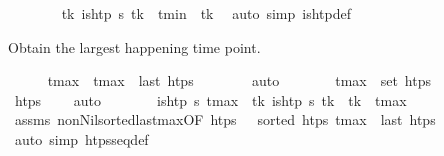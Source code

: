 \begin{isabellebody}
\ \ \ \ \ \ \isamarkupfalse%
\ {\isacartoucheopen}{\isasymforall}t\isactrlsub k{\isachardot}{\kern0pt}\ is{\isacharunderscore}{\kern0pt}htp\ {\isasympi}s\ t\isactrlsub k\ {\isasymlongrightarrow}\ t\isactrlsub m\isactrlsub i\isactrlsub n\ {\isasymle}\ t\isactrlsub k{\isacartoucheclose}\ \isamarkupfalse%
\ {\isacharparenleft}{\kern0pt}auto\ simp{\isacharcolon}{\kern0pt}\ is{\isacharunderscore}{\kern0pt}htp{\isacharunderscore}{\kern0pt}def{\isacharparenright}{\kern0pt}%
\begin{isamarkuptext}%
Obtain the largest happening time point.%
\end{isamarkuptext}\isamarkuptrue%
\ \ \ \ \isamarkupfalse%
\ t\isactrlsub m\isactrlsub a\isactrlsub x\ \ {\isachardoublequoteopen}t\isactrlsub m\isactrlsub a\isactrlsub x\ {\isacharequal}{\kern0pt}\ last\ htps{\isachardoublequoteclose}\isanewline
\ \ \ \ \ \ \isamarkupfalse%
\ auto\isanewline
\ \ \ \ \isamarkupfalse%
\ \isamarkupfalse%
\ {\isachardoublequoteopen}t\isactrlsub m\isactrlsub a\isactrlsub x\ {\isasymin}\ set\ htps{\isachardoublequoteclose}\isanewline
\ \ \ \ \ \ \isamarkupfalse%
\ {\isacartoucheopen}htps\ {\isasymnoteq}\ {\isacharbrackleft}{\kern0pt}{\isacharbrackright}{\kern0pt}{\isacartoucheclose}\ \isamarkupfalse%
\ auto\isanewline
\ \ \ \ \isamarkupfalse%
\ \isamarkupfalse%
\ {\isachardoublequoteopen}is{\isacharunderscore}{\kern0pt}htp\ {\isasympi}s\ t\isactrlsub m\isactrlsub a\isactrlsub x{\isachardoublequoteclose}\ \ {\isachardoublequoteopen}{\isasymforall}t\isactrlsub k{\isachardot}{\kern0pt}\ is{\isacharunderscore}{\kern0pt}htp\ {\isasympi}s\ t\isactrlsub k\ {\isasymlongrightarrow}\ t\isactrlsub k\ {\isasymle}\ t\isactrlsub m\isactrlsub a\isactrlsub x{\isachardoublequoteclose}\isanewline
\ \ \ \ \ \ \isamarkupfalse%
\ assms\ non{\isacharunderscore}{\kern0pt}Nil{\isacharunderscore}{\kern0pt}sorted{\isacharunderscore}{\kern0pt}last{\isacharunderscore}{\kern0pt}max{\isacharbrackleft}{\kern0pt}OF\ {\isacartoucheopen}htps\ {\isasymnoteq}\ {\isacharbrackleft}{\kern0pt}{\isacharbrackright}{\kern0pt}{\isacartoucheclose}\ {\isacartoucheopen}sorted\ htps{\isacartoucheclose}\ {\isacartoucheopen}t\isactrlsub m\isactrlsub a\isactrlsub x\ {\isacharequal}{\kern0pt}\ last\ htps{\isacartoucheclose}{\isacharbrackright}{\kern0pt}\ \isanewline
\ \ \ \ \ \ \isamarkupfalse%
\ {\isacharparenleft}{\kern0pt}auto\ simp{\isacharcolon}{\kern0pt}\ htps{\isacharunderscore}{\kern0pt}seq{\isacharunderscore}{\kern0pt}def{\isacharparenright}{\kern0pt}\isanewline

\end{isabellebody}
